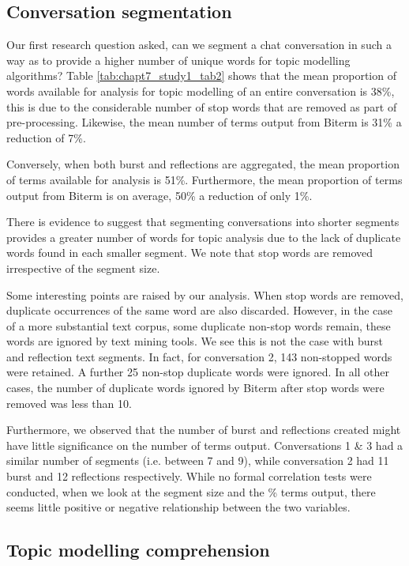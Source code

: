 \subsection{Conversation segmentation}

Our first research question asked, can we segment a chat conversation in such a way as to provide a higher number of unique words for topic modelling algorithms? Table \ref{tab:chapt7_study1_tab2} shows that the mean proportion of words available for analysis for topic modelling of an entire conversation is 38\%, this is due to the considerable number of stop words that are removed as part of pre-processing. Likewise, the mean number of terms output from Biterm is 31\% a reduction of 7\%.

Conversely, when both burst and reflections are aggregated, the mean proportion of terms available for analysis is 51\%. Furthermore, the mean proportion of terms output from Biterm is on average, 50\% a reduction of only 1\%.

There is evidence to suggest that segmenting conversations into shorter segments provides a greater number of words for topic analysis due to the lack of duplicate words found in each smaller segment. We note that stop words are removed irrespective of the segment size.

Some interesting points are raised by our analysis. When stop words are removed, duplicate occurrences of the same word are also discarded. However, in the case of a more substantial text corpus, some duplicate non-stop words remain, these words are ignored by text mining tools. We see this is not the case with burst and reflection text segments. In fact, for conversation 2, 143 non-stopped words were retained. A further 25 non-stop duplicate words were ignored. In all other cases, the number of duplicate words ignored by Biterm after stop words were removed was less than 10.

Furthermore, we observed that the number of burst and reflections created might have little significance on the number of terms output. Conversations 1 \& 3 had a similar number of segments (i.e. between 7 and 9), while conversation 2 had 11 burst and 12 reflections respectively. While no formal correlation tests were conducted, when we look at the segment size and the \% terms output, there seems little positive or negative relationship between the two variables.


\subsection{Topic modelling comprehension}

